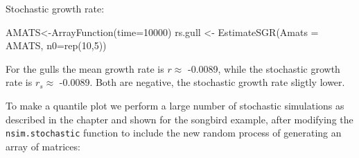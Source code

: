 \documentclass[
]{book}
\newenvironment{Shaded}{\begin{snugshade}}{\end{snugshade}}
\newcommand{\AttributeTok}[1]{\textcolor[rgb]{0.77,0.63,0.00}{#1}}
\newcommand{\DecValTok}[1]{\textcolor[rgb]{0.00,0.00,0.81}{#1}}
\newcommand{\FunctionTok}[1]{\textcolor[rgb]{0.00,0.00,0.00}{#1}}
\newcommand{\NormalTok}[1]{#1}
\newcommand{\OtherTok}[1]{\textcolor[rgb]{0.56,0.35,0.01}{#1}}
\newcommand{\SpecialCharTok}[1]{\textcolor[rgb]{0.00,0.00,0.00}{#1}}
\begin{document}
\begin{Shaded}
\end{Shaded}

Stochastic growth rate:

\begin{Shaded}
\begin{Highlighting}[]
\NormalTok{AMATS}\OtherTok{\textless{}{-}}\FunctionTok{ArrayFunction}\NormalTok{(}\AttributeTok{time=}\DecValTok{10000}\NormalTok{)}
\NormalTok{rs.gull }\OtherTok{\textless{}{-}} \FunctionTok{EstimateSGR}\NormalTok{(}\AttributeTok{Amats =}\NormalTok{ AMATS, }\AttributeTok{n0=}\FunctionTok{rep}\NormalTok{(}\DecValTok{10}\NormalTok{,}\DecValTok{5}\NormalTok{))}
\end{Highlighting}
\end{Shaded}

For the gulls the mean growth rate is \(r\approx\) -0.0089, while the stochastic growth rate is \(r_s\approx\) -0.0089. Both are negative, the stochastic growth rate sligtly lower.

To make a quantile plot we perform a large number of stochastic simulations as described in the chapter and shown for the songbird example, after modifying the \texttt{nsim.stochastic} function to include the new random process of generating an array of matrices:
\end{document}
